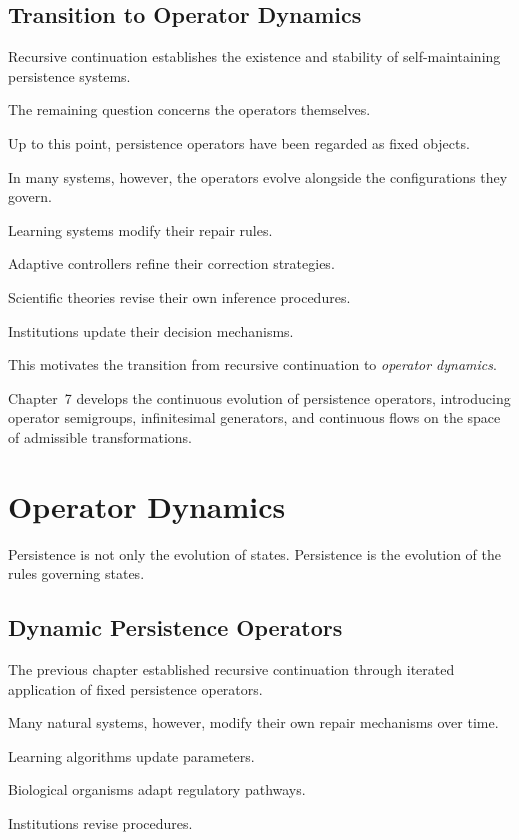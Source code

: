 \documentclass[11pt]{book}
\numberwithin{equation}{chapter}
\theoremstyle{definition}
\theoremstyle{plain}
\begin{document}
\section{Transition to Operator Dynamics}

Recursive continuation establishes the existence and stability of
self-maintaining persistence systems.

The remaining question concerns the operators themselves.

Up to this point, persistence operators have been regarded as fixed
objects.

In many systems, however, the operators evolve alongside the
configurations they govern.

Learning systems modify their repair rules.

Adaptive controllers refine their correction strategies.

Scientific theories revise their own inference procedures.

Institutions update their decision mechanisms.

This motivates the transition from recursive continuation to
\emph{operator dynamics}.

Chapter~7 develops the continuous evolution of persistence operators,
introducing operator semigroups, infinitesimal generators, and
continuous flows on the space of admissible transformations.

\chapter{Operator Dynamics}

\epigraph{%
Persistence is not only the evolution of states.
Persistence is the evolution of the rules governing states.
}{}

\section{Dynamic Persistence Operators}

The previous chapter established recursive continuation through
iterated application of fixed persistence operators.

Many natural systems, however, modify their own repair mechanisms over
time.

Learning algorithms update parameters.

Biological organisms adapt regulatory pathways.

Institutions revise procedures.
\end{document}
